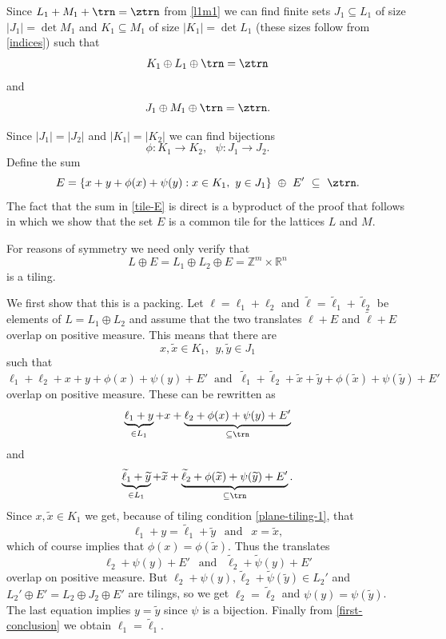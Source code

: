 \documentclass[12pt,a4paper,oneside]{amsart}
\theoremstyle{plain}
\theoremstyle{definition}
\newcommand{\Abs}[1]{{\left|{#1}\right|}}
\newcommand{\Set}[1]{{\left\{{#1}\right\}}}
\newcommand{\RR}{{\mathbb R}}
\newcommand{\ZZ}{{\mathbb Z}}
\newcommand{\wt}[1]{\widetilde{#1}}
\begin{document}
Since $L_1 + M_1 + \trn = \ztrn$ from \eqref{l1m1} we can find finite sets $J_1 \subseteq L_1$ of size $\Abs{J_1} = \det M_1$ and $K_1 \subseteq M_1$ of size $\Abs{K_1} = \det L_1$ (these sizes follow from \eqref{indices}) such that
\begin{equation}\label{plane-tiling-1}
K_1 \oplus L_1 \oplus \trn = \ztrn
\end{equation}
and
\begin{equation}\label{plane-tiling-2}
J_1 \oplus M_1 \oplus \trn = \ztrn.
\end{equation}


Since $\Abs{J_1} = \Abs{J_2}$ and $\Abs{K_1} = \Abs{K_2}$ we can find bijections
$$
\phi:K_1 \to K_2,\ \ \ \psi:J_1 \to J_2.
$$
Define the sum
\begin{equation}\label{tile-E}
E = \Set{x+y+\phi(x)+\psi(y): x\in K_1,\ y \in J_1} \ \oplus\  E' \ \subseteq \  \ztrn.
\end{equation}
The fact that the sum in \eqref{tile-E} is direct is a byproduct of the proof that follows in which we show that the set $E$ is a common tile for the lattices $L$ and $M$.

For reasons of symmetry we need only verify that
$$
L \oplus E = L_1\oplus L_2 \oplus E = \ZZ^m \times \RR^n
$$
is a tiling.

We first show that this is a packing.
Let $\ell=\ell_1+\ell_2$ and $\wt\ell=\wt\ell_1+\wt\ell_2$ be elements of $L = L_1\oplus L_2$ and assume that the two translates $\ell+E$ and $\wt\ell+E$ overlap on positive measure. This means that there are
$$
x, \wt x \in K_1,\ \ y, \wt y \in J_1
$$
such that
$$
\ell_1 + \ell_2 + x + y + \phi(x) + \psi(y) + E'
\ \text{ and }\ 
\wt\ell_1 + \wt\ell_2 + \wt x + \wt y + \phi(\wt x) + \psi(\wt y) + E'
$$
overlap on positive measure. These can be rewritten as
$$
\underbrace{\ell_1 + y}_{\in L_1} + x + \underbrace{\ell_2 + \phi(x) + \psi(y) + E'}_{\subseteq \trn}
$$
and
$$ 
\underbrace{\wt\ell_1 + \wt y}_{\in L_1} + \wt x + \underbrace{\wt\ell_2 + \phi(\wt x) + \psi(\wt y) + E'}_{\subseteq \trn}.
$$
Since $x, \wt x \in K_1$ we get, because of tiling condition \eqref{plane-tiling-1}, that
\begin{equation}\label{first-conclusion}
\ell_1+y =\wt\ell_1+\wt y \ \ \text{ and }\ \  x = \wt x,
\end{equation}
which of course implies that $\phi(x) = \phi(\wt x)$.
Thus the translates
$$
\ell_2 + \psi(y) + E' \ \ \text{ and }\ \ \wt\ell_2 + \wt\psi(y) + E'
$$
overlap on positive measure. But $\ell_2+\psi(y), \wt\ell_2+\wt\psi(\wt y) \in L_2'$ and $L_2'\oplus E' = L_2 \oplus J_2 \oplus E'$ are tilings, so we get $\ell_2 = \wt\ell_2$ and $\psi(y) = \psi(\wt y)$. The last equation implies $y = \wt y$ since $\psi$ is a bijection. Finally from \eqref{first-conclusion} we obtain $\ell_1 = \wt\ell_1$.
\end{document}
